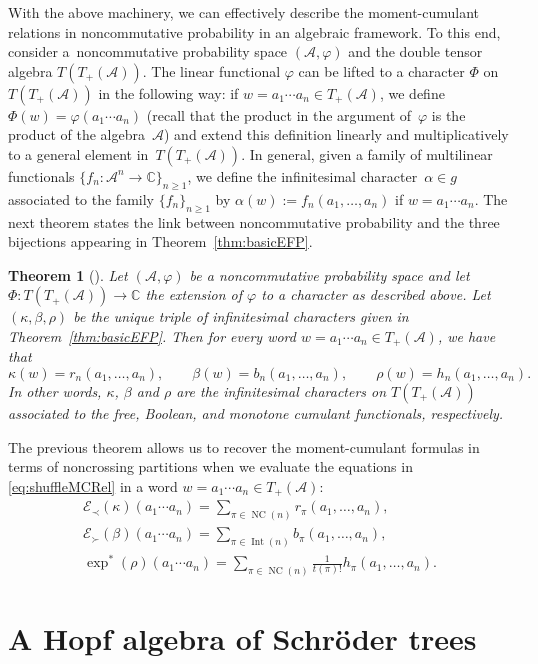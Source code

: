 \documentclass[pdftex]{sigma}%
\numberwithin{equation}{section}
\newtheorem{Theorem}{Theorem}[section]
\newcommand{\A}{\mathcal{A}}
\newcommand{\NC}{\operatorname{NC}}
\newcommand{\Int}{\operatorname{Int}}
\newcommand{\Expl}{\mathcal{E}_\prec}
\newcommand{\Expr}{\mathcal{E}_\succ}
\begin{document}
 With the above machinery, we can effectively describe the moment-cumulant relations in noncommutative probability in an algebraic framework. To this end, consider a~noncommutative probability space $(\A,\varphi)$ and the double tensor algebra $T(T_+(\A))$. The linear functional $\varphi$ can be lifted to a character $\Phi$ on $T(T_+(\A))$ in the following way: if $w = a_1\cdots a_n \in T_+(\A)$, we define $\Phi(w) = \varphi(a_1\cdots a_n)$ (recall that the product in the argument of~$\varphi$ is the product of the algebra~$\A$) and extend this definition linearly and multiplicatively to a general element in~$T(T_+(\A))$. In general, given a family of multilinear functionals $\{f_n\colon \A^n\to \mathbb{C} \}_{n\geq1}$, we define the infinitesimal character~$\alpha \in g$ associated to the family $\{f_n\}_{n\geq1}$ by $\alpha(w) := f_n(a_1,\dots,a_n)$ if $w= a_1\cdots a_n$. The next theorem states the link between noncommutative probability and the three bijections appearing in Theorem~\ref{thm:basicEFP}.

\begin{Theorem}[\cite{EFP1,EFP3}]\label{thm:linkNCP}
Let $(\A,\varphi)$ be a noncommutative probability space and let $\Phi\colon T(T_+(\A)) \allowbreak \to \mathbb{C}$ the extension of $\varphi$ to a character as described above. Let $(\kappa,\beta,\rho)$ be the unique triple of infinitesimal characters given in Theorem~{\rm \ref{thm:basicEFP}}. Then for every word $w = a_1\cdots a_n \in T_+(\A)$, we have that
\[
	\kappa(w) = r_n(a_1,\dots,a_n),
	\qquad
	\beta(w) = b_n(a_1,\dots,a_n),
	\qquad
	\rho(w) = h_n(a_1,\dots,a_n).
\]
In other words, $\kappa$, $\beta$ and $\rho$ are the infinitesimal characters on $T(T_+(\A))$ associated to the free, Boolean, and monotone cumulant functionals, respectively.
\end{Theorem}
The previous theorem allows us to recover the moment-cumulant formulas in terms of noncrossing partitions when we evaluate the equations in \eqref{eq:shuffleMCRel} in a word $w= a_1\cdots a_n\in T_+(\A)$:
\begin{gather*}
	\Expl(\kappa)(a_1\cdots a_n)
	= \sum_{\pi\in \NC(n)} r_\pi(a_1,\dots,a_n),\\
	\Expr(\beta)(a_1\cdots a_n)
	= \sum_{\pi\in \Int(n)} b_\pi(a_1,\dots,a_n),\\
	\exp^*(\rho)(a_1\cdots a_n)
	= \sum_{\pi\in \NC(n)} \frac{1}{t(\pi)!}h_\pi(a_1,\dots,a_n).
\end{gather*}


\section{A Hopf algebra of Schr\"oder trees}\label{sec:schroder}
\end{document}
